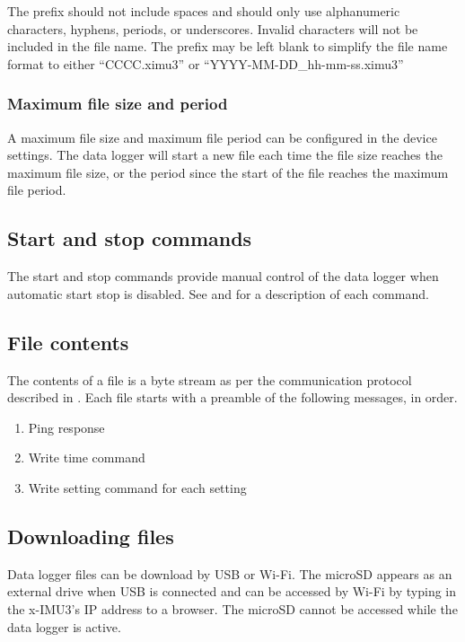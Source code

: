 The prefix should not include spaces and should only use alphanumeric characters, hyphens, periods, or underscores.  Invalid characters will not be included in the file name.  The prefix may be left blank to simplify the file name format to either \enquote{CCCC.ximu3} or \enquote{YYYY-MM-DD\_hh-mm-ss.ximu3}

\subsubsection{Maximum file size and period}
\label{sec:maximumFileSizeAndPeriod}

A maximum file size and maximum file period can be configured in the device settings.  The data logger will start a new file each time the file size reaches the maximum file size, or the period since the start of the file reaches the maximum file period.

\subsection{Start and stop commands}

The start and stop commands provide manual control of the data logger when automatic start stop is disabled.  See  and  for a description of each command.

\subsection{File contents}

The contents of a file is a byte stream as per the communication protocol described in .  Each file starts with a preamble of the following messages, in order.

\begin{enumerate}[nolistsep]
    \item Ping response
    \item Write time command
    \item Write setting command for each setting
\end{enumerate}

\subsection{Downloading files}

Data logger files can be download by \ac{USB} or Wi-Fi.  The \ac{microSD} appears as an external drive when \ac{USB} is connected and can be accessed by Wi-Fi by typing in the x-IMU3's \ac{IP} address to a browser.  The \ac{microSD} cannot be accessed while the data logger is active.
